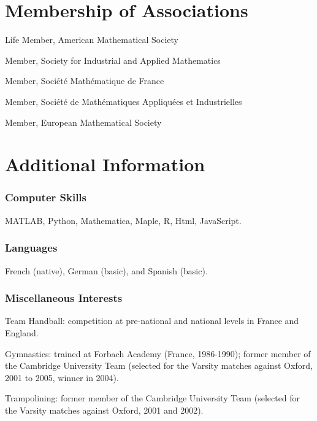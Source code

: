 \documentclass[11pt]{article}
\begin{document}
\section{Membership of Associations}

\bitemize
\item Life Member, American Mathematical Society
\item Member, Society for Industrial and Applied Mathematics
\item Member, Soci\'{e}t\'{e} Math\'{e}matique de France
\item Member, Soci\'et\'e de Math\'ematiques Appliqu\'ees et Industrielles
\item Member, European Mathematical Society
\eitemize


\section{Additional Information}

\subsubsection{Computer Skills} 
MATLAB, Python, Mathematica, Maple, R, Html, JavaScript.

\subsubsection{Languages}
French (native), German (basic), and Spanish (basic).

\subsubsection{Miscellaneous Interests} 
\bitemize
\item Team Handball: competition at pre-national and national levels in France and England.
\item Gymnastics:  trained at Forbach Academy (France, 1986-1990); former member of the Cambridge University Team (selected for the Varsity matches against Oxford, 2001 to 2005, winner in 2004).
\item Trampolining: former member of the Cambridge University Team (selected for the Varsity matches against Oxford, 2001 and 2002).
\eitemize

\end{document}
